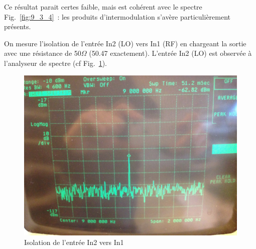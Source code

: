 \documentclass{article}
\begin{document}
Ce résultat parait certes faible, mais est cohérent avec le spectre Fig.~\ref{fig:9_3_4}~: les produits d'intermodulation s'avère particulièrement présents.



%
%


On mesure l'isolation de l'entrée In2 (LO) vers In1 (RF) en chargeant la sortie avec une résistance de 50$\Omega$ (50.47 exactement).
L'entrée In2 (LO) est observée à l'analyseur de spectre (cf Fig.~\ref{fig:9_3_5}). 

\begin{figure}[h!]
	\centering
	\includegraphics[width=.7\textwidth]{9_3_5}
	\caption{Isolation de l'entrée In2 vers In1}
	\label{fig:9_3_5}
\end{figure}
\end{document}

